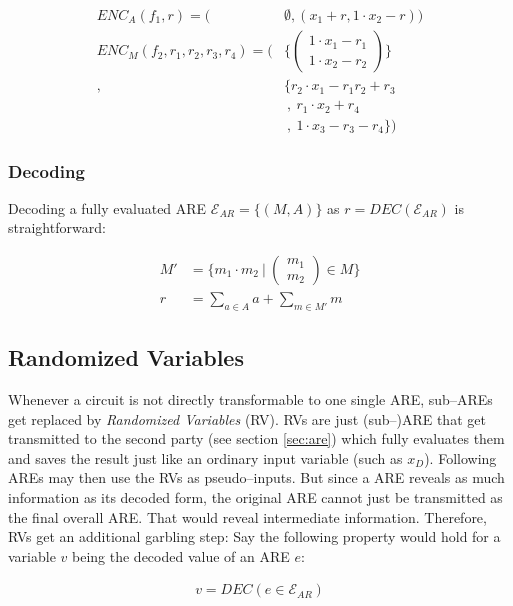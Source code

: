 \documentclass[12pt, a4paper]{article}
\begin{document}
\begin{align*}
ENC_A(f_1, r) = \Big( & \emptyset, (x_1 + r, 1 \cdot x_2 - r)\Big) \\
ENC_M(f_2,  r_1, r_2, r_3, r_4) = \Bigg( & \bigg\{
\begin{pmatrix}1 \cdot x_1 - r_1\\1 \cdot x_2 - r_2\end{pmatrix} \bigg\}\\
,& \bigg\{r_2 \cdot x_1 -r_1r_2+r_3 \\
&\ ,\ r_1 \cdot x_2 + r_4 \\
&\ ,\ 1 \cdot x_3-r_3-r_4\bigg\} \Bigg)
\end{align*}


\subsubsection{Decoding}
\label{sec:affinization_decoding}

Decoding a fully evaluated ARE $\mathcal{E}_{AR} = \{(M,A)\}$ as $r =
DEC(\mathcal{E}_{AR})$ is
straightforward:

\begin{align*}
M' &= \Bigg\{ m_1 \cdot m_2\ \Bigg|\ \begin{pmatrix}m_1\\m_2\end{pmatrix}
\in M \Bigg\} \\
r & = \sum_{a \in A} a + \sum_{m \in M'} m
\end{align*}


\subsection{Randomized Variables}
\label{sec:rv}

Whenever a circuit is not directly transformable to one single ARE, sub--AREs
get replaced by \emph{Randomized Variables} (RV). RVs are just (sub--)ARE that
get transmitted to the second party (see section \ref{sec:are}) which
fully evaluates them and saves the result just like an ordinary input variable
(such as $x_D$). Following AREs may then use the RVs as pseudo--inputs. But
since a ARE reveals as much information as its decoded form, the original ARE
cannot just be transmitted as the final overall ARE. That would reveal
intermediate information. Therefore, RVs get an additional garbling step: Say
the following property would hold for a variable $v$ being the decoded value of
an ARE $e$:

\begin{align*}
  v = DEC(e \in \mathcal{E}_{AR})
\end{align*}
\end{document}
